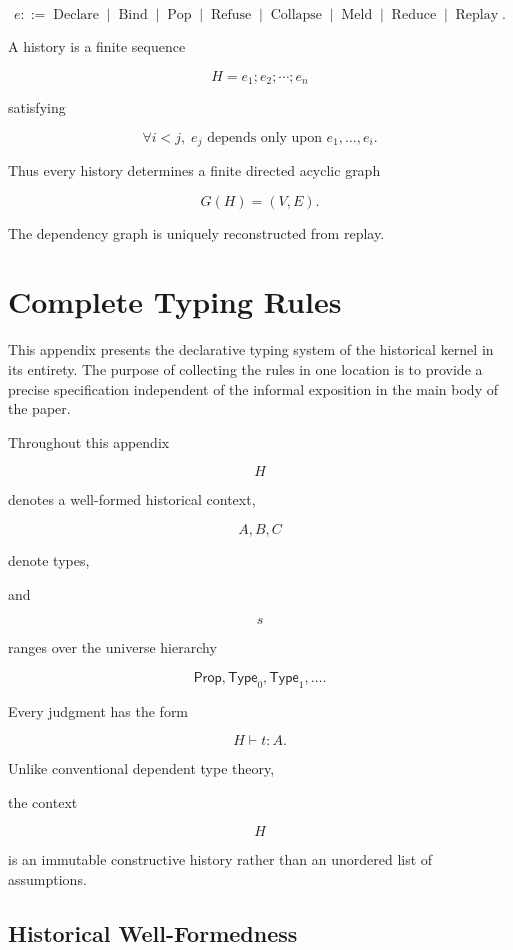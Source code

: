 \documentclass[12pt,oneside]{article}
\theoremstyle{definition}
\theoremstyle{remark}
\newcommand{\Type}{\mathsf{Type}}
\newcommand{\Prop}{\mathsf{Prop}}
\begin{document}
\[
e
::=
\operatorname{Declare}
\mid
\operatorname{Bind}
\mid
\operatorname{Pop}
\mid
\operatorname{Refuse}
\mid
\operatorname{Collapse}
\mid
\operatorname{Meld}
\mid
\operatorname{Reduce}
\mid
\operatorname{Replay}.
\]

A history is a finite sequence

\[
H=e_1;e_2;\cdots;e_n
\]

satisfying

\[
\forall i<j,\;
e_j
\text{ depends only upon }
e_1,\ldots,e_i.
\]

Thus every history determines a finite directed acyclic graph

\[
G(H)
=
(V,E).
\]

The dependency graph is uniquely reconstructed from replay.

\section{Complete Typing Rules}

This appendix presents the declarative typing system of the historical kernel in
its entirety. The purpose of collecting the rules in one location is to provide
a precise specification independent of the informal exposition in the main body
of the paper.

Throughout this appendix

\[
H
\]

denotes a well-formed historical context,

\[
A,B,C
\]

denote types,

and

\[
s
\]

ranges over the universe hierarchy

\[
\Prop,
\Type_0,
\Type_1,
\ldots.
\]

Every judgment has the form

\[
H
\vdash
t
:
A.
\]

Unlike conventional dependent type theory,

the context

\[
H
\]

is an immutable constructive history rather than an unordered list of
assumptions.


\subsection{Historical Well-Formedness}
\end{document}
